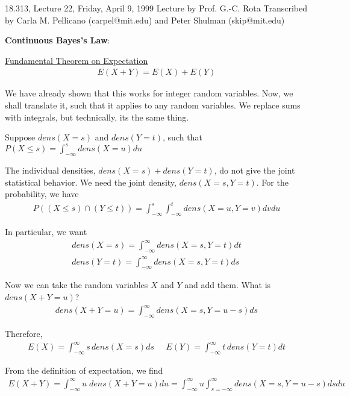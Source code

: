 {\Large 18.313, Lecture 22, Friday, April 9, 1999}\newline
{\large Lecture by Prof. G.-C. Rota}\newline
Transcribed by Carla M. Pellicano (carpel@mit.edu) and Peter Shulman (skip@mit.edu)\newline

{\bf Continuous Bayes's Law}:

\noindent\underline{Fundamental Theorem on Expectation}
\begin{eqnarray*}
E(X+Y)=E(X)+E(Y)
\end{eqnarray*}

We have already shown that this works for integer random variables.  Now, we shall translate it, such that it applies to any random variables.  We replace sums with integrals, but technically, its the same thing.

Suppose $dens(X=s)$ and $dens(Y=t)$, such that $P(X\leq s)=\int_{-\infty}^{s}\!\!\! dens(X=u)du$

The individual densities, $dens(X=s)+dens(Y=t)$, do not give the joint statistical behavior.  We need the joint density, $dens(X=s,Y=t)$.  For the probability, we have
\begin{eqnarray*}
P((X\leq s)\cap(Y\leq t))=\int_{-\infty}^{s}\!\int_{-\infty}^{t}\!\!\! dens(X=u,Y=v)dvdu
\end{eqnarray*}

In particular, we want
\begin{eqnarray*}
dens(X=s)=\int_{-\infty}^{\infty}\!\!\! dens(X=s,Y=t)dt\\
dens(Y=t)=\int_{-\infty}^{\infty}\!\!\! dens(X=s,Y=t)ds
\end{eqnarray*}

Now we can take the random variables $X$ and $Y$ and add them.  What is $dens(X+Y=u)$?
\begin{eqnarray*}
dens(X+Y=u)=\int_{-\infty}^{\infty}\!\!dens(X=s,Y=u-s)ds
\end{eqnarray*}

Therefore, 
\begin{eqnarray*}
E(X)=\int_{-\infty}^{\infty}\!\!\!\!s\,dens(X=s)ds\;\;\;\;\;E(Y)=\int_{-\infty}^{\infty}\!\!\!\!t\,dens(Y=t)dt
\end{eqnarray*}

From the definition of expectation, we find
\begin{eqnarray*}
E(X+Y)=\int_{-\infty}^{\infty}\!\!\!u\;dens(X+Y=u)du=\int_{-\infty}^{\infty}\!\!\!u\int_{s=-\infty}^{\infty}\!\!\!\!\!\! dens(X=s,Y=u-s)dsdu
\end{eqnarray*}


